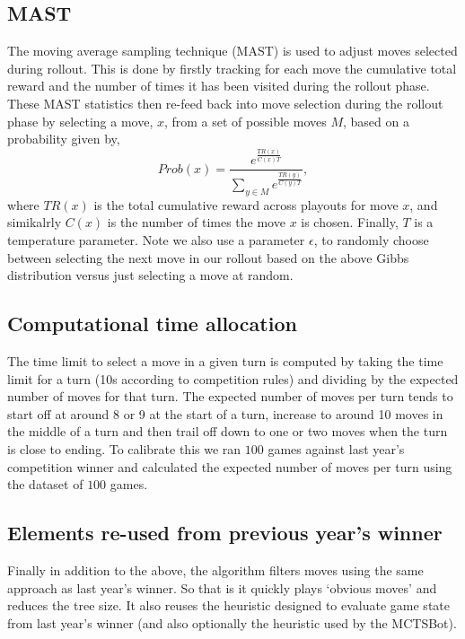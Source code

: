 \documentclass[a4paper,10pt]{article}
\begin{document}
\subsection{MAST}
The moving average sampling technique (MAST) is used to adjust moves selected during rollout. This is done by firstly tracking for each move the cumulative total reward and the number of times it has been visited during the rollout phase. These MAST statistics then re-feed back into move selection during the rollout phase by selecting a move, $x$, from a set of possible moves $M$, based on a probability given by,
\begin{equation}
Prob(x) = \frac{e^{\frac{TR(x)}{C(x)T}}}{\sum_{y  \in M} e^{\frac{TR(y)}{C(y)T}}},
\end{equation}
where $TR(x)$ is the total cumulative reward across playouts for move $x$, and simikalrly $C(x)$ is the number of times the move $x$ is chosen. Finally, $T$ is a temperature parameter.  Note we also use a parameter $\epsilon$, to randomly choose between selecting the next move in our rollout based on the above Gibbs distribution versus just selecting a move at random.

\subsection{Computational time allocation}
The time limit to select a move in a given turn is computed by taking the time limit for a turn (10s according to competition rules) and dividing by the expected number of moves for that turn. The expected number of moves per turn tends to start off at around 8 or 9 at the start of a turn, increase to around 10 moves in the middle of a turn and then trail off down to one or two moves when the turn is close to ending. To calibrate this we ran $100$ games against last year's competition winner and calculated the expected number of moves per turn using the dataset of $100$ games.

\subsection{Elements re-used from previous year's winner}
Finally in addition to the above, the algorithm filters moves using the same approach as last year's winner. So that is it quickly plays `obvious moves' and reduces the tree size. It also reuses the heuristic designed to evaluate game state from last year's winner (and also optionally the heuristic used by the MCTSBot).
\end{document}
